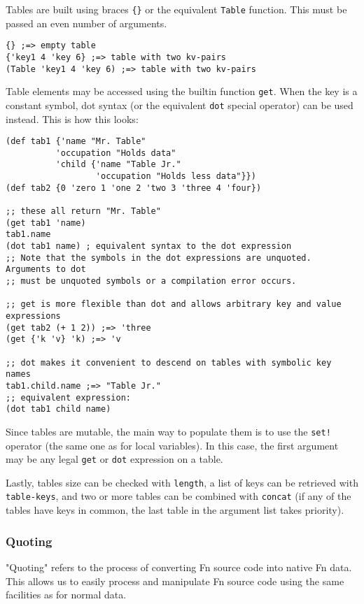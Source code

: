 \documentclass[11pt]{article}
\begin{document}
Tables are built using braces \texttt{\{\}} or the equivalent \texttt{Table} function. This must be
passed an even number of arguments.

\begin{verbatim}
{} ;=> empty table
{'key1 4 'key 6} ;=> table with two kv-pairs
(Table 'key1 4 'key 6) ;=> table with two kv-pairs
\end{verbatim}

Table elements may be accessed using the builtin function \texttt{get}. When the key is a
constant symbol, dot syntax (or the equivalent \texttt{dot} special operator) can be
used instead. This is how this looks:

\begin{verbatim}
(def tab1 {'name "Mr. Table"
          'occupation "Holds data"
          'child {'name "Table Jr." 
                  'occupation "Holds less data"}})
(def tab2 {0 'zero 1 'one 2 'two 3 'three 4 'four})

;; these all return "Mr. Table"
(get tab1 'name)
tab1.name
(dot tab1 name) ; equivalent syntax to the dot expression
;; Note that the symbols in the dot expressions are unquoted. Arguments to dot 
;; must be unquoted symbols or a compilation error occurs.

;; get is more flexible than dot and allows arbitrary key and value expressions
(get tab2 (+ 1 2)) ;=> 'three
(get {'k 'v} 'k) ;=> 'v

;; dot makes it convenient to descend on tables with symbolic key names
tab1.child.name ;=> "Table Jr."
;; equivalent expression:
(dot tab1 child name)
\end{verbatim}

Since tables are mutable, the main way to populate them is to use the \texttt{set!}
operator (the same one as for local variables). In this case, the first argument
may be any legal \texttt{get} or \texttt{dot} expression on a table.

Lastly, tables size can be checked with \texttt{length}, a list of keys can be retrieved
with \texttt{table-keys}, and two or more tables can be combined with \texttt{concat} (if any of
the tables have keys in common, the last table in the argument list takes
priority).


\subsubsection{Quoting}
\label{sec:orgef30853}

"Quoting" refers to the process of converting Fn source code into native Fn
data. This allows us to easily process and manipulate Fn source code using the
same facilities as for normal data.
\end{document}

